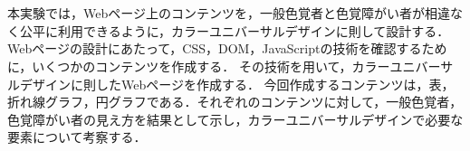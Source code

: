 \section{\purpose}
本実験では，Webページ上のコンテンツを，一般色覚者と色覚障がい者が相違なく公平に利用できるように，カラーユニバーサルデザインに則して設計する．
Webページの設計にあたって，CSS，DOM，JavaScriptの技術を確認するために，いくつかのコンテンツを作成する．
その技術を用いて，カラーユニバーサルデザインに則したWebページを作成する．
今回作成するコンテンツは，表，折れ線グラフ，円グラフである．それぞれのコンテンツに対して，一般色覚者，色覚障がい者の見え方を結果として示し，カラーユニバーサルデザインで必要な要素について考察する．